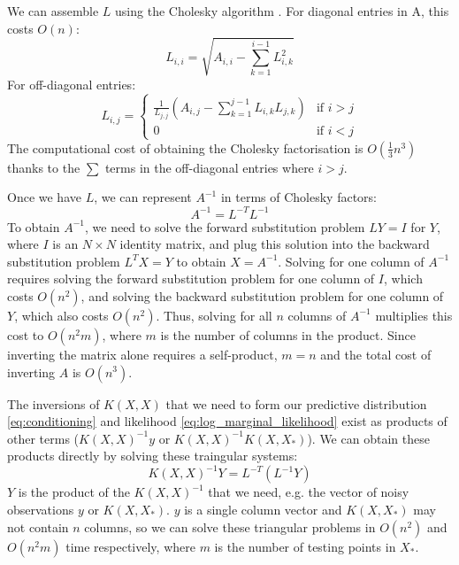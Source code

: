 We can assemble $L$ using the Cholesky algorithm \cite{big-data}. For diagonal entries in A, this costs $O(n)$:
\begin{equation*}
    L_{i,i} = \sqrt{A_{i,i} - \sum_{k=1}^{i-1} L_{i,k}^2}
\end{equation*}
For off-diagonal entries:
\begin{equation*}
    L_{i,j} = \begin{cases}
        \frac{1}{L_{j,j}} \left( A_{i,j} - \sum_{k=1}^{j-1} L_{i,k} L_{j,k} \right) & \text{if } i > j \\
        0 & \text{if } i < j
    \end{cases}
\end{equation*}
The computational cost of obtaining the Cholesky factorisation is $O(\frac{1}{3} n^3)$ thanks to the $\sum$ terms in the off-diagonal entries where $i > j$.

Once we have $L$, we can represent $A^{-1}$ in terms of Cholesky factors: 
\begin{equation*}
    A^{-1} = L^{-T} L^{-1}
\end{equation*}
To obtain $A^{-1}$, we need to solve the forward substitution problem $LY = I$ for $Y$, where $I$ is an $N \times N$ identity matrix, and plug this solution into the backward substitution problem $L^TX = Y$ to obtain $X = A^{-1}$. Solving for one column of $A^{-1}$ requires solving the forward substitution problem for one column of $I$, which costs $O(n^2)$, and solving the backward substitution problem for one column of $Y$, which also costs $O(n^2)$. Thus, solving for all $n$ columns of $A^{-1}$ multiplies this cost to $O(n^2m)$, where $m$ is the number of columns in the product. Since inverting the matrix alone requires a self-product, $m = n$ and the total cost of inverting $A$ is $O(n^3)$.

The inversions of $K(X, X)$ that we need to form our predictive distribution \ref{eq:conditioning} and likelihood \ref{eq:log_marginal_likelihood} exist as products of other terms ($K(X,X)^{-1} y$ or $K(X,X)^{-1} K(X, X_*)$). We can obtain these products directly by solving these traingular systems:
\begin{equation*}
    K(X, X)^{-1} Y = L^{-T} (L^{-1} Y)
\end{equation*}
$Y$ is the product of the $K(X, X)^{-1}$ that we need, e.g. the vector of noisy observations $y$ or $K(X, X_*)$. $y$ is a single column vector and $K(X, X_*)$ may not contain $n$ columns, so we can solve these triangular problems in $O(n^2)$ and $O(n^2m)$ time respectively, where $m$ is the number of testing points in $X_*$.

